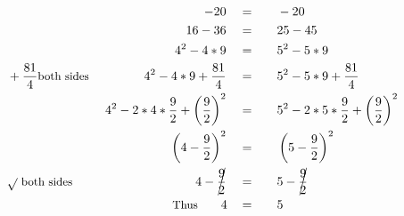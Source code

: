 \begin{alignat*}{5}
&\,&-20\quad&=\quad&&-20\\
&\,&16-36\quad&=&&25-45\\
&\,&4^2-4*9\quad&=&&5^2-5*9\\
&\small+\frac{81}{4}\text{both sides }&4^2-4*9+\frac{81}{4}\quad&=&&5^2-5*9+\frac{81}{4}\\
&\,&4^2-2*4*\frac{9}{2}+\left(\frac{9}{2}\right)^2\quad&=&&5^2-2*5*\frac{9}{2}+ \left(\frac{9}{2}\right)^2\\
&\,&\left(4-\frac{9}{2}\right)^2\quad&=&&\left(5-\frac{9}{2}\right)^2\\
&\small\sqrt{}~\text{both sides }&4-\cancel{\frac{9}{2}}\quad&=&&5-\cancel{\frac{9}{2}}\\
&\,&\small\text{Thus}\qquad4\quad&=&&5
\end{alignat*}
